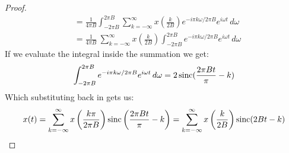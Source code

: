 \documentclass [../article.tex]{subfiles}
\begin{document}
\begin{proof}
\begin{align*}
      {} &= \frac{1}{{4\pi B}}\int_{-{2\pi B}}^{2\pi B} \sum_{k=-\infty}^\infty x\left(\frac{k}{2B}\right)e^{-i\pi k\omega/{2\pi B}} e^{i\omega t}\,d\omega\\
      {} &= \frac{1}{{4\pi B}}\ \sum_{k=-\infty}^\infty x\left(\frac{k}{2B}\right)\int_{-{2\pi B}}^{2\pi B} e^{-i\pi k\omega/{2\pi B}} e^{i\omega t}\,d\omega
    \end{align*}
    If we evaluate the integral inside the summation we get:
    \[\int_{-{2\pi B}}^{2\pi B} e^{-i\pi k\omega/{2\pi B}} e^{i\omega t}\,d\omega = 2\operatorname{sinc}(\frac{{2\pi B} t}{\pi}-k)\]
    Which substituting back in gets us:
    \[ x(t) = \sum_{k=-\infty}^\infty x\left(\frac{k\pi}{{2\pi B}}\right)
    \operatorname{sinc}\left(\frac{{2\pi B} t}{\pi}-k\right) = \sum_{k=-\infty}^\infty x\left(\frac{k}{2B}\right)\operatorname{sinc}(2Bt-k) \]
  \end{proof}
\end{document}
